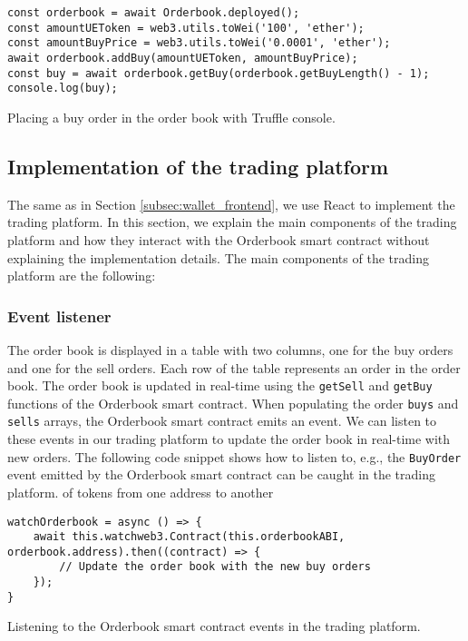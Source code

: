 \begin{listing}[H]
    \begin{verbatim}
const orderbook = await Orderbook.deployed();
const amountUEToken = web3.utils.toWei('100', 'ether');
const amountBuyPrice = web3.utils.toWei('0.0001', 'ether');
await orderbook.addBuy(amountUEToken, amountBuyPrice);
const buy = await orderbook.getBuy(orderbook.getBuyLength() - 1);
console.log(buy);
        \end{verbatim}
    \caption{Placing a buy order in the order book with Truffle console.}
    \label{lst:orderbook_buy}
\end{listing}


\subsection{Implementation of the trading platform}


The same as in  Section \ref{subsec:wallet_frontend}, we use React to implement the trading platform. In this section, we explain the main components of the trading
platform and how they interact with the Orderbook smart contract without explaining the implementation details. The main components of the trading platform are
the following:


\subsubsection{Event listener}


The order book is displayed in a table with two columns, one for the buy orders and one for the sell orders. Each row of the table represents an order in the order book.
The order book is updated in real-time using the \texttt{getSell} and \texttt{getBuy} functions of the Orderbook smart contract. When populating the order \texttt{buys} and
\texttt{sells} arrays, the Orderbook smart contract emits an event. We can listen to these events in our trading platform to update the order book in real-time with
new orders. The following code snippet shows how to listen to, e.g., the \texttt{BuyOrder} event emitted by the Orderbook smart contract can be caught in the trading platform.
of tokens from one address to another
\begin{listing}[H]
    \begin{verbatim}
watchOrderbook = async () => {
    await this.watchweb3.Contract(this.orderbookABI, orderbook.address).then((contract) => {
        // Update the order book with the new buy orders
    });
}
    \end{verbatim}
    \caption{Listening to the Orderbook smart contract events in the trading platform.}
    \label{lst:watch_orderbook}
\end{listing}

